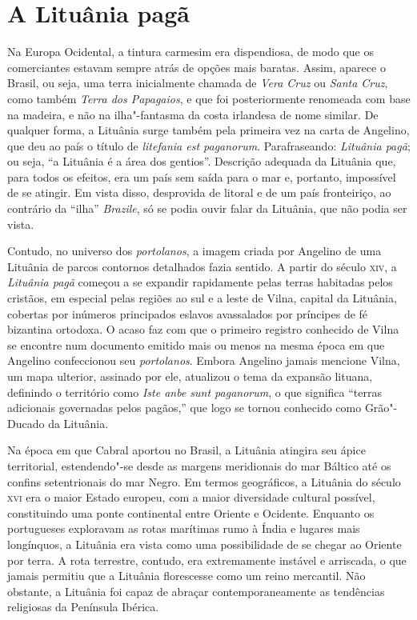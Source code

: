 \section*{A Lituânia pagã}

Na Europa
Ocidental, a tintura carmesim era dispendiosa, de modo que os
comerciantes estavam sempre atrás de opções mais baratas. Assim, aparece
o Brasil, ou seja, uma terra inicialmente chamada de \textit{Vera Cruz} ou
\textit{Santa Cruz}, como também \textit{Terra dos Papagaios}, e que foi
posteriormente renomeada com base na madeira, e não na ilha"-fantasma da
costa irlandesa de nome similar. De qualquer forma, a Lituânia surge
também pela primeira vez na carta de Angelino, que deu ao país o título
de \textit{litefania est paganorum}. Parafraseando: \textit{Lituânia
pagã}; ou seja, ``a Lituânia é a área dos gentios''. Descrição
adequada da Lituânia que, para todos os efeitos, era um país sem saída
para o mar e, portanto, impossível de se atingir. Em vista disso,
desprovida de litoral e de um país fronteiriço, ao contrário da ``ilha''
\textit{Brazile}, só se podia ouvir falar da Lituânia, que não podia ser vista.

Contudo, no universo dos \textit{portolanos}, a imagem criada por Angelino de uma
Lituânia de parcos contornos detalhados fazia sentido. A partir do
século \textsc{xiv}, a \textit{Lituânia pagã} começou a se expandir rapidamente pelas
terras habitadas pelos cristãos, em especial pelas regiões ao sul e a
leste de Vilna, capital da Lituânia, cobertas por inúmeros principados
eslavos avassalados por príncipes de fé bizantina ortodoxa. O acaso faz
com que o primeiro registro conhecido de Vilna se encontre num documento
emitido mais ou menos na mesma época em que Angelino confeccionou seu
\textit{portolanos}. Embora Angelino jamais mencione Vilna, um mapa ulterior,
assinado por ele, atualizou o tema da expansão lituana, definindo o
território como \textit{Iste anbe sunt paganorum}, o que significa
``terras adicionais governadas pelos pagãos,'' que logo se tornou
conhecido como Grão"-Ducado da Lituânia. 

Na época em que Cabral aportou
no Brasil, a Lituânia atingira seu ápice territorial, estendendo"-se
desde as margens meridionais do mar Báltico até os confins setentrionais
do mar Negro. Em termos geográficos, a Lituânia do século \textsc{xvi} era o maior
Estado europeu, com a maior diversidade cultural possível, constituindo
uma ponte continental entre Oriente e Ocidente. Enquanto os portugueses
exploravam as rotas marítimas rumo à Índia e lugares mais longínquos, a
Lituânia era vista como uma possibilidade de se chegar ao Oriente por
terra. A rota terrestre, contudo, era extremamente instável e arriscada,
o que jamais permitiu que a Lituânia florescesse como um reino
mercantil. Não obstante, a Lituânia foi capaz de abraçar
contemporaneamente as tendências religiosas da Península Ibérica.

